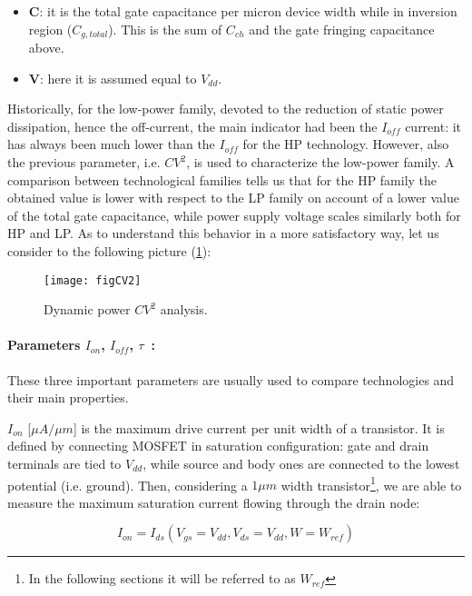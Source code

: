 \documentclass[a4paper, 12pt, twoside, openright]{report}
\begin{document}
\begin{itemize}
\item \textbf{C}: it is the total gate capacitance per micron device width while in inversion region ($C_{g,total}$). This is the sum of $C_{ch}$ and the gate fringing capacitance above.
\item \textbf{V}: here it is assumed equal to $V_{dd}$.
\end{itemize}

Historically, for the low-power family, devoted to the reduction of static power dissipation, hence the off-current, the main indicator had been the $I_{off}$ current: it has always been much lower than the $I_{off}$ for the HP technology. However, also the previous parameter, i.e. $CV^{2}$, is used to characterize the low-power family. A comparison between technological families tells us that for the HP family the obtained value is lower with respect to the LP family on account of a lower value of the total gate capacitance, while power supply voltage scales similarly both for HP and LP. As to understand this behavior in a more satisfactory way, let us consider to the following picture (\ref{CV2}):

	\begin{figure}[h]
	\centering
	\texttt{[image: figCV2]}
	\caption{Dynamic power $CV^{2}$ analysis.}
	\label{CV2}
	\end{figure}


\paragraph{Parameters $I_{on}$, $I_{off}$, $\tau$~:} These three important parameters are usually used to compare technologies and their main properties.

$I_{on}$ [$\mu A/\mu m$] is the maximum drive current per unit width of a transistor. It is defined by connecting MOSFET in saturation configuration: gate and drain terminals are tied to $V_{dd}$, while source and body ones are connected to the lowest potential (i.e. ground). Then, considering a $1 \mu m$ width transistor\footnote{In the following sections it will be referred to as $W_{ref}$}, we are able to measure the maximum saturation current flowing through the drain node:

\begin{equation}
I_{on} = I_{ds}(V_{gs}=V_{dd}, V_{ds}=V_{dd}, W=W_{ref})
\label{}
\end{equation} 
\end{document}

